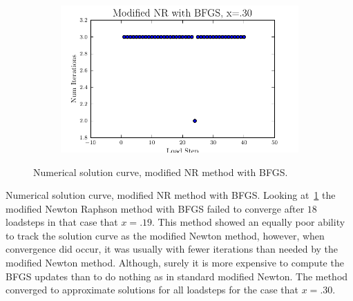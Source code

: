 \documentclass[10pt,letterpaper]{article}
\begin{document}
\begin{figure}[!tbh]
\begin{subfigure}[b]{.6\textwidth}
    \caption{}
    \label{fig5:label:c}
  \end{subfigure}
  \hfill
  \begin{subfigure}[b]{.6\textwidth}
    \includegraphics[width=\textwidth]{moded_nr_bfgs_x30_conv.pdf}
    \caption{}
    \label{fig5:label:d}
  \end{subfigure}
    \caption{Numerical solution curve, modified NR method with BFGS.}
\end{figure}

Numerical solution curve, modified NR method with BFGS. Looking at~\ref{fig5:label:c} the modified Newton Raphson method with BFGS failed to converge after $18$ loadsteps in that case that $x=.19$. This method showed an equally poor ability to track the solution curve as the modified Newton method, however, when convergence did occur, it was usually with fewer iterations than needed by the modified Newton method. Although, surely it is more expensive to compute the BFGS updates than to do nothing as in standard modified Newton. The method converged to approximate solutions for all loadsteps for the case that $x=.30$.
\end{document}
